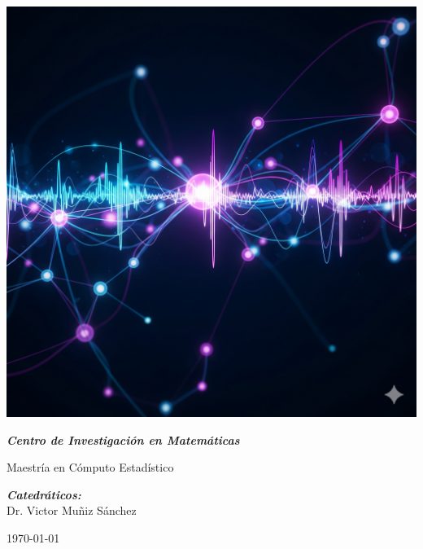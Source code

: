 \begin{titlepage}
\vspace{0.5cm}
\begin{center}
    \includegraphics[scale=0.1]{Images/Portada.png}\par
    \vspace{1cm}
    {\textit{\bfseries\huge Centro de Investigación en Matemáticas}\par}
    \vspace{0.5cm}
    {\large Maestría en Cómputo Estadístico\par}
    \vspace{1cm}
\end{center}

\begin{center} \large
    {\emph{\textbf{Catedráticos:}}}\\
    \large Dr. Victor Muñiz Sánchez\par
    \vspace{0.3cm}
    \large \today
\end{center}

\end{titlepage}

